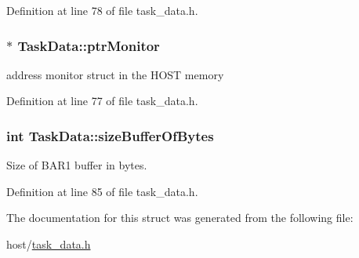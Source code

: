 Definition at line 78 of file task\_\-data.h.\hypertarget{structTaskData_a2e4a75b578879ae694ecca2a409f26ab}{
\subsubsection[{ptrMonitor}]{$\ast$ {\bf TaskData::ptrMonitor}}}
\label{structTaskData_a2e4a75b578879ae694ecca2a409f26ab}


address monitor struct in the HOST memory 

Definition at line 77 of file task\_\-data.h.\hypertarget{structTaskData_a8981c450153c3f98283391622e26428d}{
\subsubsection[{sizeBufferOfBytes}]{\setlength{\rightskip}{0pt plus 5cm}int {\bf TaskData::sizeBufferOfBytes}}}
\label{structTaskData_a8981c450153c3f98283391622e26428d}


Size of BAR1 buffer in bytes. 

Definition at line 85 of file task\_\-data.h.

The documentation for this struct was generated from the following file:\begin{DoxyCompactItemize}
\item 
host/\hyperlink{task__data_8h}{task\_\-data.h}\end{DoxyCompactItemize}
